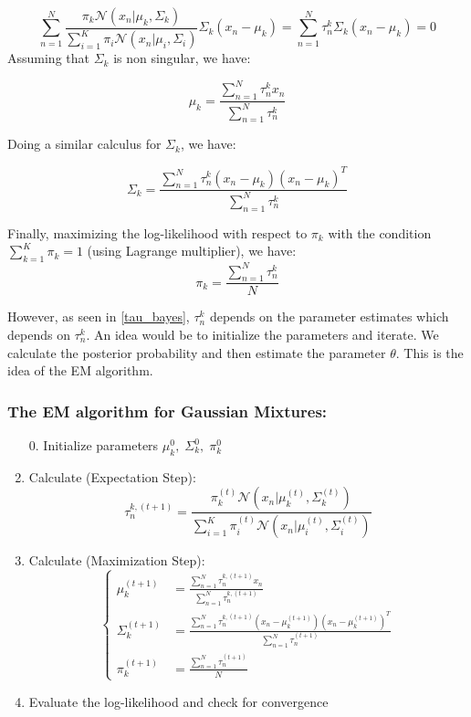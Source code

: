 \documentclass[12pt]{article}
\begin{document}
\begin{equation}
\sum_{n=1}^N\frac{\pi_k \mathcal N(x_n|\mu_k,\Sigma_k)}{\sum_{i=1}^K\pi_i\mathcal N(x_n|\mu_i,\Sigma_i)} \Sigma_k(x_n-\mu_k)=\sum_{n=1}^N \tau_n^k \Sigma_k(x_n-\mu_k)=0
\end{equation}
Assuming that $\Sigma_k$ is non singular, we have:

\begin{equation}
\mu_k=\frac{\sum_{n=1}^N\tau_n^k x_n}{\sum_{n=1}^N\tau_n^k}
\end{equation}

Doing a similar calculus for $\Sigma_k$, we have:

\begin{equation}
\Sigma_k=\frac{\sum_{n=1}^N \tau_n^k (x_n-\mu_k)(x_n-\mu_k)^T}{\sum_{n=1}^N\tau_n^k}
\end{equation}

Finally, maximizing the log-likelihood with respect to $\pi_k$ with the condition $\sum_{k=1}^K\pi_k=1$ (using Lagrange multiplier), we have:
\begin{equation}
\pi_k=\frac{\sum_{n=1}^N\tau_n^k}{N}
\end{equation}

However, as seen in \eqref{tau_bayes}, $\tau_n^k$ depends on the parameter estimates which depends on $\tau_n^k$. An idea would be to initialize the parameters and iterate. We calculate the posterior probability and then estimate the parameter $\theta$. This is the idea of the EM algorithm.
\\

\subsubsection{The EM algorithm for Gaussian Mixtures:}
\begin{enumerate}
\item[0.] Initialize parameters $\mu_k^0,\; \Sigma_k^0,\;\pi_k^0$
\item Calculate (Expectation Step):
\begin{equation}
\tau_n^{k,(t+1)}=\frac{\pi_k^{(t)} \mathcal N(x_n|\mu_k^{(t)},\Sigma_k^{(t)})}{\sum_{i=1}^K\pi_i^{(t)}\mathcal N(x_n|\mu_i^{(t)},\Sigma_i^{(t)})}
\end{equation}
\item Calculate (Maximization Step):
\begin{equation}
 \begin{cases}
\mu_k^{(t+1)}&=\frac{\sum_{n=1}^N\tau_n^{k,(t+1)} x_n}{\sum_{n=1}^N\tau_n^{k,(t+1)}}\\
\Sigma_k^{(t+1)}&=\frac{\sum_{n=1}^N \tau_n^{k,(t+1)} (x_n-\mu_k^{(t+1)})(x_n-\mu_k^{(t+1)})^T}{\sum_{n=1}^N\tau_n^{(t+1)}}\\
\pi_k^{(t+1)}&=\frac{\sum_{n=1}^N\tau_n^{(t+1)}}{N}
\end{cases}
\end{equation}

\item Evaluate the log-likelihood and check for convergence
\end{enumerate}
\end{document}
